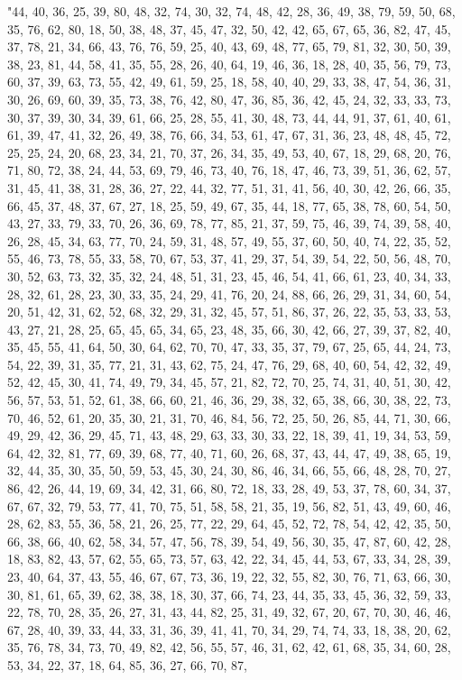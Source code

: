 \documentclass[
]{article}
\begin{document}
\begin{Schunk}
\begin{Soutput}
"44, 40, 36, 25, 39, 80, 48, 32, 74, 30, 32, 74, 48, 42, 28, 36, 49, 38, 79, 59, 50, 68, 35, 76, 62, 80, 18, 50, 38, 48, 37, 45, 47, 32, 50, 42, 42, 65, 67, 65, 36, 82, 47, 45, 37, 78, 21, 34, 66, 43, 76, 76, 59, 25, 40, 43, 69, 48, 77, 65, 79, 81, 32, 30, 50, 39, 38, 23, 81, 44, 58, 41, 35, 55, 28, 26, 40, 64, 19, 46, 36, 18, 28, 40, 35, 56, 79, 73, 60, 37, 39, 63, 73, 55, 42, 49, 61, 59, 25, 18, 58, 40, 40, 29, 33, 38, 47, 54, 36, 31, 30, 26, 69, 60, 39, 35, 73, 38, 76, 42, 80, 47, 36, 85, 36, 42, 45, 24, 32, 33, 33, 73, 30, 37, 39, 30, 34, 39, 61, 66, 25, 28, 55, 41, 30, 48, 73, 44, 44, 91, 37, 61, 40, 61, 61, 39, 47, 41, 32, 26, 49, 38, 76, 66, 34, 53, 61, 47, 67, 31, 36, 23, 48, 48, 45, 72, 25, 25, 24, 20, 68, 23, 34, 21, 70, 37, 26, 34, 35, 49, 53, 40, 67, 18, 29, 68, 20, 76, 71, 80, 72, 38, 24, 44, 53, 69, 79, 46, 73, 40, 76, 18, 47, 46, 73, 39, 51, 36, 62, 57, 31, 45, 41, 38, 31, 28, 36, 27, 22, 44, 32, 77, 51, 31, 41, 56, 40, 30, 42, 26, 66, 35, 66, 45, 37, 48, 37, 67, 27, 18, 25, 59, 49, 67, 35, 44, 18, 77, 65, 38, 78, 60, 54, 50, 43, 27, 33, 79, 33, 70, 26, 36, 69, 78, 77, 85, 21, 37, 59, 75, 46, 39, 74, 39, 58, 40, 26, 28, 45, 34, 63, 77, 70, 24, 59, 31, 48, 57, 49, 55, 37, 60, 50, 40, 74, 22, 35, 52, 55, 46, 73, 78, 55, 33, 58, 70, 67, 53, 37, 41, 29, 37, 54, 39, 54, 22, 50, 56, 48, 70, 30, 52, 63, 73, 32, 35, 32, 24, 48, 51, 31, 23, 45, 46, 54, 41, 66, 61, 23, 40, 34, 33, 28, 32, 61, 28, 23, 30, 33, 35, 24, 29, 41, 76, 20, 24, 88, 66, 26, 29, 31, 34, 60, 54, 20, 51, 42, 31, 62, 52, 68, 32, 29, 31, 32, 45, 57, 51, 86, 37, 26, 22, 35, 53, 33, 53, 43, 27, 21, 28, 25, 65, 45, 65, 34, 65, 23, 48, 35, 66, 30, 42, 66, 27, 39, 37, 82, 40, 35, 45, 55, 41, 64, 50, 30, 64, 62, 70, 70, 47, 33, 35, 37, 79, 67, 25, 65, 44, 24, 73, 54, 22, 39, 31, 35, 77, 21, 31, 43, 62, 75, 24, 47, 76, 29, 68, 40, 60, 54, 42, 32, 49, 52, 42, 45, 30, 41, 74, 49, 79, 34, 45, 57, 21, 82, 72, 70, 25, 74, 31, 40, 51, 30, 42, 56, 57, 53, 51, 52, 61, 38, 66, 60, 21, 46, 36, 29, 38, 32, 65, 38, 66, 30, 38, 22, 73, 70, 46, 52, 61, 20, 35, 30, 21, 31, 70, 46, 84, 56, 72, 25, 50, 26, 85, 44, 71, 30, 66, 49, 29, 42, 36, 29, 45, 71, 43, 48, 29, 63, 33, 30, 33, 22, 18, 39, 41, 19, 34, 53, 59, 64, 42, 32, 81, 77, 69, 39, 68, 77, 40, 71, 60, 26, 68, 37, 43, 44, 47, 49, 38, 65, 19, 32, 44, 35, 30, 35, 50, 59, 53, 45, 30, 24, 30, 86, 46, 34, 66, 55, 66, 48, 28, 70, 27, 86, 42, 26, 44, 19, 69, 34, 42, 31, 66, 80, 72, 18, 33, 28, 49, 53, 37, 78, 60, 34, 37, 67, 67, 32, 79, 53, 77, 41, 70, 75, 51, 58, 58, 21, 35, 19, 56, 82, 51, 43, 49, 60, 46, 28, 62, 83, 55, 36, 58, 21, 26, 25, 77, 22, 29, 64, 45, 52, 72, 78, 54, 42, 42, 35, 50, 66, 38, 66, 40, 62, 58, 34, 57, 47, 56, 78, 39, 54, 49, 56, 30, 35, 47, 87, 60, 42, 28, 18, 83, 82, 43, 57, 62, 55, 65, 73, 57, 63, 42, 22, 34, 45, 44, 53, 67, 33, 34, 28, 39, 23, 40, 64, 37, 43, 55, 46, 67, 67, 73, 36, 19, 22, 32, 55, 82, 30, 76, 71, 63, 66, 30, 30, 81, 61, 65, 39, 62, 38, 38, 18, 30, 37, 66, 74, 23, 44, 35, 33, 45, 36, 32, 59, 33, 22, 78, 70, 28, 35, 26, 27, 31, 43, 44, 82, 25, 31, 49, 32, 67, 20, 67, 70, 30, 46, 46, 67, 28, 40, 39, 33, 44, 33, 31, 36, 39, 41, 41, 70, 34, 29, 74, 74, 33, 18, 38, 20, 62, 35, 76, 78, 34, 73, 70, 49, 82, 42, 56, 55, 57, 46, 31, 62, 42, 61, 68, 35, 34, 60, 28, 53, 34, 22, 37, 18, 64, 85, 36, 27, 66, 70, 87, 
\end{Soutput}
\end{Schunk}
\end{document}
